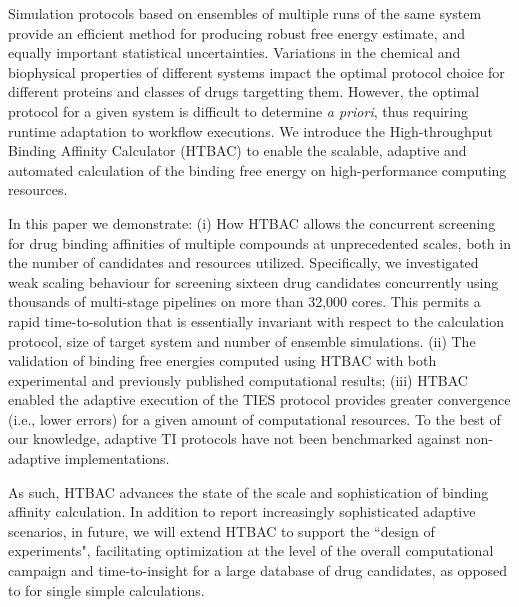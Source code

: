 
Simulation protocols based on ensembles of multiple runs of the same system
provide an efficient method for producing robust free energy estimate, and
equally important statistical uncertainties. Variations in the chemical and
biophysical properties of different systems impact the optimal protocol choice
for different proteins and classes of drugs targetting them. However, the optimal protocol for a given system 
is difficult to determine {\it a priori}, thus requiring runtime adaptation
to workflow executions. We introduce the High-throughput Binding Affinity
Calculator (HTBAC) to enable the scalable, adaptive and automated calculation
of the binding free energy on high-performance computing resources.

In this paper we demonstrate: (i) How HTBAC allows the concurrent screening
for drug binding affinities of multiple compounds at unprecedented scales,
both in the number of candidates and resources utilized. Specifically, we
investigated weak scaling behaviour for screening sixteen drug candidates
concurrently using thousands of multi-stage pipelines on more than 32,000
cores. This permits a rapid time-to-solution that is essentially invariant
with respect to the calculation protocol, size of target system and number
of ensemble simulations. (ii) The validation of binding free energies computed
using HTBAC with both experimental and previously published computational
results; (iii) HTBAC enabled the adaptive execution of the TIES protocol
provides greater convergence (i.e., lower errors) for a given amount of
computational resources. To the best of our knowledge, adaptive TI protocols
have not been benchmarked against non-adaptive implementations.





As such, HTBAC advances the state of the scale and sophistication of binding
affinity calculation. In addition to report increasingly sophisticated
adaptive scenarios, in future, we will extend HTBAC to support the ``design of
experiments", facilitating optimization at the level of the overall
computational campaign and time-to-insight for a large database of drug
candidates, as opposed to for single simple calculations.


